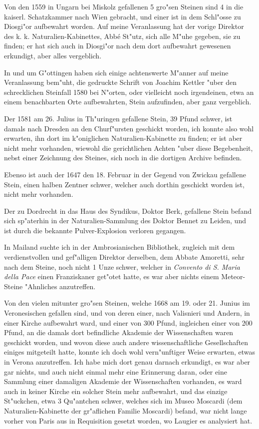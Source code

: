 \documentclass[a4paper, 11pt, oneside, polutonikogreek, german]{article}
\begin{document}
Von den 1559 in Ungarn bei Miskolz gefallenen 5 gro"sen Steinen sind 4 in die kaiserl. Schatzkammer nach Wien gebracht, und einer ist in dem Schl"osse zu Diosgi"or aufbewahrt worden. Auf meine Veranlassung hat der vorige Direktor des k. k. Naturalien-Kabinettes, Abbé St"utz, sich alle M"uhe gegeben, sie zu finden; er hat sich auch in Diosgi"or nach dem dort aufbewahrt gewesenen erkundigt, aber alles vergeblich.

In und um G"ottingen haben sich einige achtenswerte M"anner auf meine Veranlassung bem"uht, die gedruckte Schrift von Joachim Kettler "uber den schrecklichen Steinfall 1580 bei N"orten, oder vielleicht noch irgendeinen, etwa an einem benachbarten Orte aufbewahrten, Stein aufzufinden, aber ganz vergeblich.

Der 1581 am 26. Julius in Th"uringen gefallene Stein, 39 Pfund schwer, ist damals nach Dresden an den Churf"ursten geschickt worden, ich konnte also wohl erwarten, ihn dort im k"oniglichen Naturalien-Kabinette zu finden; er ist aber nicht mehr vorhanden, wiewohl die gerichtlichen Achten "uber diese Begebenheit, nebst einer Zeichnung des Steines, sich noch in die dortigen Archive befinden.

Ebenso ist auch der 1647 den 18. Februar in der Gegend von Zwickau gefallene Stein, einen halben Zentner schwer, welcher auch dorthin geschickt worden ist, nicht mehr vorhanden.

Der zu Dordrecht in das Haus des Syndikus, Doktor Berk, gefallene Stein befand sich sp"aterhin in der Naturalien-Sammlung des Doktor Bennet zu Leiden, und ist durch die bekannte Pulver-Explosion verloren gegangen.

In Mailand suchte ich in der Ambrosianischen Bibliothek, zugleich mit dem verdienstvollen und gef"alligen Direktor derselben, dem Abbate Amoretti, sehr nach dem Steine, noch nicht 1 Unze schwer, welcher in \emph{Convento di S. Maria della Pace} einen Franziskaner get"otet hatte, es war aber nichts einem Meteor-Steine "Ahnliches anzutreffen.

Von den vielen mitunter gro"sen Steinen, welche 1668 am 19. oder 21. Junius im Veronesischen gefallen sind, und von deren einer, nach Valisnieri und Andern, in einer Kirche aufbewahrt ward, und einer von 300 Pfund, ingleichen einer von 200 Pfund, an die damals dort befindliche Akademie der Wissenschaften waren geschickt worden, und wovon diese auch andere wissenschaftliche Gesellschaften einiges mitgeteilt hatte, konnte ich doch wohl vern"unftiger Weise erwarten, etwas in Verona anzutreffen. Ich habe mich dort genau darnach erkundigt, es war aber gar nichts, und auch nicht einmal mehr eine Erinnerung daran, oder eine Sammlung einer damaligen Akademie der Wissenschaften vorhanden, es ward auch in keiner Kirche ein solcher Stein mehr aufbewahrt, und das einzige St"uckchen, etwa 3 Qu"antchen schwer, welches sich im Museo Moscardi (dem Naturalien-Kabinette der gr"aflichen Familie Moscardi) befand, war nicht lange vorher von Paris aus in Requisition gesetzt worden, wo Laugier es analysiert hat.
\end{document}
